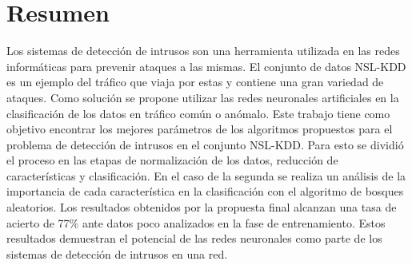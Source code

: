 \chapter*{Resumen}\label{chapter:abstract}

% 

Los sistemas de detección de intrusos son una herramienta utilizada en las redes informáticas para prevenir ataques a las mismas. El conjunto de datos NSL-KDD es un ejemplo del tráfico que viaja por estas y contiene una gran variedad de ataques. Como solución se propone utilizar las redes neuronales artificiales en la clasificación de los datos en tráfico común o anómalo. Este trabajo tiene como objetivo encontrar los mejores parámetros de los algoritmos propuestos para el problema de detección de intrusos en el conjunto  NSL-KDD. Para esto se dividió el proceso en las etapas de normalización de los datos, reducción de características y clasificación. En el caso de la segunda se realiza un análisis de la importancia de cada característica en la clasificación con el algoritmo de bosques aleatorios. Los resultados obtenidos por la propuesta final alcanzan una tasa de acierto de 77\% ante datos poco analizados en la fase de entrenamiento. Estos resultados demuestran el potencial de las redes neuronales como parte de los sistemas de detección de intrusos en una red.